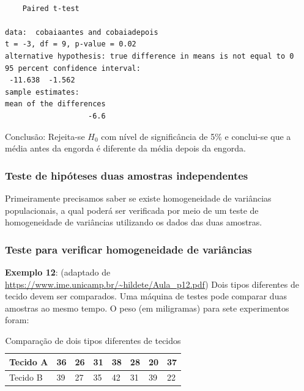 \documentclass[12pt,brazil,oneside]{book}
\begin{document}
\begin{verbatim}

    Paired t-test

data:  cobaiaantes and cobaiadepois
t = -3, df = 9, p-value = 0.02
alternative hypothesis: true difference in means is not equal to 0
95 percent confidence interval:
 -11.638  -1.562
sample estimates:
mean of the differences 
                   -6.6 
\end{verbatim}

Conclusão: Rejeita-se \(H_0\) com nível de significância de 5\% e conclui-se que a média antes da engorda é diferente da média depois da engorda.

\hypertarget{teste-de-hipoteses-duas-amostras-independentes}{%
\subsubsection{Teste de hipóteses duas amostras independentes}\label{teste-de-hipoteses-duas-amostras-independentes}}

Primeiramente precisamos saber se existe homogeneidade de variâncias populacionais, a qual poderá ser verificada por meio de um teste de homogeneidade de variâncias utilizando os dados das duas amostras.

\hypertarget{teste-para-verificar-homogeneidade-de-variancias}{%
\subsubsection{Teste para verificar homogeneidade de variâncias}\label{teste-para-verificar-homogeneidade-de-variancias}}

\textbf{Exemplo 12}: (adaptado de \url{https://www.ime.unicamp.br/~hildete/Aula_p12.pdf}) Dois tipos diferentes de tecido devem ser comparados. Uma máquina de testes pode comparar duas amostras ao mesmo tempo. O peso (em miligramas) para sete experimentos foram:

\begin{table}

\caption{\label{tab:unnamed-chunk-113}Comparação de dois tipos diferentes de tecidos}
\centering
\begin{tabular}[t]{l|l|l|l|l|l|l|l}
\hline
Tecido A & 36 & 26 & 31 & 38 & 28 & 20 & 37\\
\hline
Tecido B & 39 & 27 & 35 & 42 & 31 & 39 & 22\\
\hline
\end{tabular}
\end{table}
\end{document}
